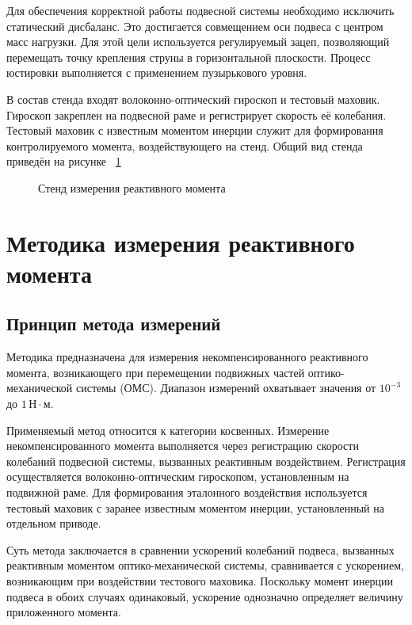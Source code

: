 Для обеспечения корректной работы подвесной системы необходимо исключить статический дисбаланс. Это достигается совмещением оси подвеса с центром масс нагрузки. Для этой цели используется регулируемый зацеп, позволяющий перемещать точку крепления струны в горизонтальной плоскости. Процесс юстировки выполняется с применением пузырькового уровня. 

В состав стенда входят волоконно-оптический гироскоп и тестовый маховик. Гироскоп закреплен на подвесной раме и регистрирует скорость её колебания. Тестовый маховик с известным моментом инерции служит для формирования контролируемого момента, воздействующего на стенд. Общий вид стенда приведён на рисунке ~\cref{fig:yoiom}

\begin{figure}[!h] 
	\caption{Стенд измерения реактивного момента}
	\label{fig:yoiom} 
\end{figure}

\section{Методика измерения реактивного момента}

\subsection{Принцип метода измерений}

Методика предназначена для измерения некомпенсированного реактивного момента, возникающего при перемещении подвижных частей оптико-механической системы (ОМС). Диапазон измерений охватывает значения от $10^{-3}$ до $1 \,\text{Н}\cdot\text{м}$.

Применяемый метод относится к категории косвенных. Измерение некомпенсированного момента выполняется через регистрацию скорости колебаний подвесной системы, вызванных реактивным воздействием. Регистрация осуществляется волоконно-оптическим гироскопом, установленным на подвижной раме. Для формирования эталонного воздействия используется тестовый маховик с заранее известным моментом инерции, установленный на отдельном приводе.

Суть метода заключается в сравнении ускорений колебаний подвеса, вызванных реактивным моментом оптико-механической системы, сравнивается с ускорением, возникающим при воздействии тестового маховика. Поскольку момент инерции подвеса в обоих случаях одинаковый, ускорение однозначно определяет величину приложенного момента. 



